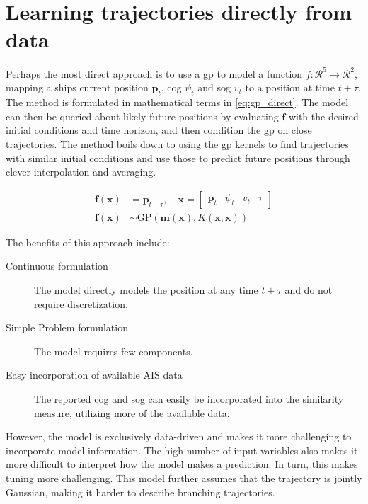\chapter{Learning trajectories directly from data}
Perhaps the most direct approach is to use a \acrshort{gp} to model a function $f: \mathcal{R}^5 \to \mathcal{R}^2$, mapping a ships current position $\boldsymbol{p}_t$, \acrshort{cog} $\psi_t$ and \acrshort{sog} $v_t$ to a position at time $t+\tau$. The method is formulated in mathematical terms in \cref{eq:gp_direct}. The model can then be queried about likely future positions by evaluating $\boldsymbol{f}$ with the desired initial conditions and time horizon, and then condition the \acrshort{gp} on close trajectories. 
The method boils down to using the \acrshort{gp} kernels to find trajectories with similar initial conditions and use those to predict future positions through clever interpolation and averaging.

\begin{subequations}\label{eq:gp_direct}
\begin{align}
    \boldsymbol{f}(\boldsymbol{x}) &= \boldsymbol{p}_{t+\tau} \label{eq:gp_direct_f}, \quad \boldsymbol{x} = \begin{bmatrix} \boldsymbol{p}_t & \psi_t & v_t & \tau\end{bmatrix}\\
    \boldsymbol{f}(\boldsymbol{x}) &\sim \text{GP}(\boldsymbol{m}(\boldsymbol{x}), K(\boldsymbol{x}, \boldsymbol{x}))\label{eq:gp_direct_f_dist}
\end{align} 
\end{subequations}

The benefits of this approach include:
\begin{description}
    \item[Continuous formulation] The model directly models the position at any time $t+\tau$ and do not require discretization. 
    \item[Simple Problem formulation] The model requires few components.
    \item[Easy incorporation of available AIS data] The reported \acrshort{cog} and \acrshort{sog} can easily be incorporated into the similarity measure, utilizing more of the available data.
\end{description}

However, the model is exclusively data-driven and makes it more challenging to incorporate model information. The high number of input variables also makes it more difficult to interpret how the model makes a prediction. In turn, this makes tuning more challenging. This model further assumes that the trajectory is jointly Gaussian, making it harder to describe branching trajectories.





